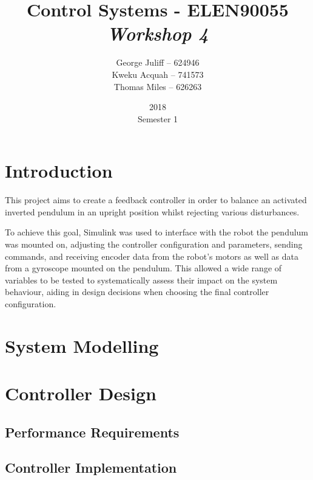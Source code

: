 \documentclass[11pt, a4paper,twocolumn]{article}
\title{\textbf{Control Systems - ELEN90055} \\ \textit{Workshop 4}}
\date{2018\\ Semester 1}
\author{George Juliff -- 624946\\Kweku Acquah -- 741573\\Thomas Miles -- 626263}
\begin{document}
\maketitle
{}
\clearpage
{}
\section{Introduction}\label{sec:intro}
This project aims to create a feedback controller in order to balance an activated inverted pendulum in an upright position whilst rejecting various disturbances.

To achieve this goal, Simulink was used to interface with the robot the pendulum was mounted on, adjusting the controller configuration and parameters, sending commands, and receiving encoder data from the robot's motors as well as data from a gyroscope mounted on the pendulum. This allowed a wide range of variables to be tested to systematically assess their impact on the system behaviour, aiding in design decisions when choosing the final controller configuration.

\section{System Modelling}\label{sec:model}
	



\section{	Controller Design	}\label{sec:design}

	\subsection{	Performance Requirements	}
	
	\subsection{	Controller Implementation	}

\end{document}
